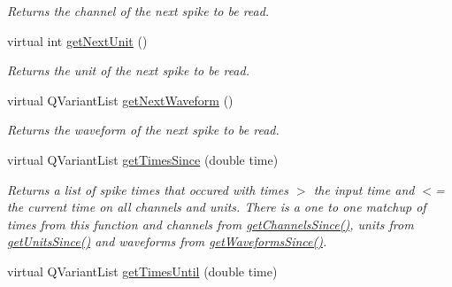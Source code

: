 \begin{DoxyCompactItemize}
\begin{DoxyCompactList}\small\item\em Returns the channel of the next spike to be read. \end{DoxyCompactList}\item 
\hypertarget{class_picto_1_1_spike_state_abd7a0c77e502e15229d741c39350394c}{virtual int \hyperlink{class_picto_1_1_spike_state_abd7a0c77e502e15229d741c39350394c}{get\-Next\-Unit} ()}\label{class_picto_1_1_spike_state_abd7a0c77e502e15229d741c39350394c}

\begin{DoxyCompactList}\small\item\em Returns the unit of the next spike to be read. \end{DoxyCompactList}\item 
\hypertarget{class_picto_1_1_spike_state_a39873ce4b1f29c2642c7c9d5c03316cc}{virtual Q\-Variant\-List \hyperlink{class_picto_1_1_spike_state_a39873ce4b1f29c2642c7c9d5c03316cc}{get\-Next\-Waveform} ()}\label{class_picto_1_1_spike_state_a39873ce4b1f29c2642c7c9d5c03316cc}

\begin{DoxyCompactList}\small\item\em Returns the waveform of the next spike to be read. \end{DoxyCompactList}\item 
\hypertarget{class_picto_1_1_spike_state_a3f5289c57f69cb73e38b55444b74853b}{virtual Q\-Variant\-List \hyperlink{class_picto_1_1_spike_state_a3f5289c57f69cb73e38b55444b74853b}{get\-Times\-Since} (double time)}\label{class_picto_1_1_spike_state_a3f5289c57f69cb73e38b55444b74853b}

\begin{DoxyCompactList}\small\item\em Returns a list of spike times that occured with times $>$ the input time and $<$= the current time on all channels and units. There is a one to one matchup of times from this function and channels from \hyperlink{class_picto_1_1_spike_state_a154d5d6c0a6c3b62115c4cfe9cebc024}{get\-Channels\-Since()}, units from \hyperlink{class_picto_1_1_spike_state_a8f1866573bf338a9c4cc388a38ad5ada}{get\-Units\-Since()} and waveforms from \hyperlink{class_picto_1_1_spike_state_a17daf1a1128b58cc00fb0ea815fb9fe4}{get\-Waveforms\-Since()}. \end{DoxyCompactList}\item 
\hypertarget{class_picto_1_1_spike_state_ae132eb7cc369b9c174eac9dd38e00413}{virtual Q\-Variant\-List \hyperlink{class_picto_1_1_spike_state_ae132eb7cc369b9c174eac9dd38e00413}{get\-Times\-Until} (double time)}\label{class_picto_1_1_spike_state_ae132eb7cc369b9c174eac9dd38e00413}


\end{DoxyCompactItemize}
